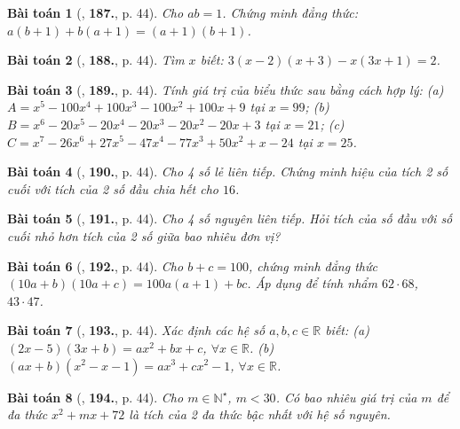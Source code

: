 \documentclass{article}
\numberwithin{equation}{section}
\newtheorem{baitoan}{Bài toán}
\begin{document}
\begin{baitoan}[\cite{Tuyen_Toan_7}, \textbf{187.}, p. 44]
	Cho $ab = 1$. Chứng minh đẳng thức: $a(b + 1) + b(a + 1) = (a + 1)(b + 1)$.
\end{baitoan}

\begin{baitoan}[\cite{Tuyen_Toan_7}, \textbf{188.}, p. 44]
	Tìm $x$ biết: $3(x - 2)(x + 3) - x(3x + 1) = 2$.
\end{baitoan}

\begin{baitoan}[\cite{Tuyen_Toan_7}, \textbf{189.}, p. 44]
	Tính giá trị của biểu thức sau bằng cách hợp lý: (a) $A = x^5 - 100x^4 + 100x^3 - 100x^2 + 100x + 9$ tại $x = 99$; (b) $B = x^6 - 20x^5 - 20x^4 - 20x^3 - 20x^2 - 20x + 3$ tại $x = 21$; (c) $C = x^7 - 26x^6 + 27x^5 - 47x^4 - 77x^3 + 50x^2 + x - 24$ tại $x = 25$.
\end{baitoan}

\begin{baitoan}[\cite{Tuyen_Toan_7}, \textbf{190.}, p. 44]
	Cho 4 số lẻ liên tiếp. Chứng minh hiệu của tích 2 số cuối với tích của 2 số đầu chia hết cho $16$.
\end{baitoan}

\begin{baitoan}[\cite{Tuyen_Toan_7}, \textbf{191.}, p. 44]
	Cho 4 số nguyên liên tiếp. Hỏi tích của số đầu với số cuối nhỏ hơn tích của 2 số giữa bao nhiêu đơn vị?
\end{baitoan}

\begin{baitoan}[\cite{Tuyen_Toan_7}, \textbf{192.}, p. 44]
	Cho $b + c = 100$, chứng minh đẳng thức $(10a + b)(10a + c) = 100a(a + 1) + bc$. Áp dụng để tính nhẩm $62\cdot68$, $43\cdot47$.
\end{baitoan}

\begin{baitoan}[\cite{Tuyen_Toan_7}, \textbf{193.}, p. 44]
	Xác định các hệ số $a,b,c\in\mathbb{R}$ biết: (a) $(2x - 5)(3x + b) = ax^2 + bx + c$, $\forall x\in\mathbb{R}$. (b) $(ax + b)(x^2 - x - 1) = ax^3 + cx^2 - 1$, $\forall x\in\mathbb{R}$.
\end{baitoan}

\begin{baitoan}[\cite{Tuyen_Toan_7}, \textbf{194.}, p. 44]
	Cho $m\in\mathbb{N}^\star$, $m < 30$. Có bao nhiêu giá trị của $m$ để đa thức $x^2 + mx + 72$ là tích của 2 đa thức bậc nhất với hệ số nguyên.
\end{baitoan}
\end{document}
